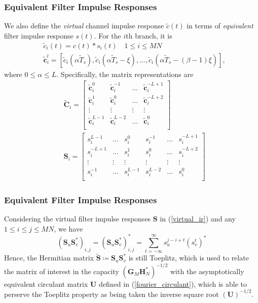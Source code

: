 \documentclass{beamer}
\begin{document}
\begin{frame}
\frametitle{Equivalent Filter Impulse Responses}
We also define the \emph{virtual} channel impulse response $\tilde{c}(t)$ in terms of \emph{equivalent} filter impulse response $s(t)$. For the $i$th branch, it is
\begin{align}
  &\tilde{c}_i(t) = c(t)*s_i(t) \quad 1\leq i\leq MN\nonumber \\
  &\tilde{\pmb{c}}_i^l = \left[\tilde{c}_i(\alpha\tilde{T}_s),\tilde{c}_i(\alpha\tilde{T}_s-\xi),\dots,\tilde{c}_i(\alpha\tilde{T}_s-(\beta-1)\xi)\right],\nonumber
\end{align}
where $0\leq\alpha\leq L$. Specifically, the matrix representations are
\begin{align}
   &\tilde{\pmb{C}}_i = \begin{bmatrix}
     \tilde{\pmb{c}}_i^0 & \tilde{\pmb{c}}_i^{-1} & \dots & \tilde{\pmb{c}}_i^{-L+1} \\%
     \tilde{\pmb{c}}_i^1 & \tilde{\pmb{c}}_i^0 & \dots & \tilde{\pmb{c}}_i^{-L+2} \\%
     \vdots & \vdots & \vdots & \vdots \\%
     \tilde{\pmb{c}}_i^{L-1} & \tilde{\pmb{c}}_i^{L-2} & \dots & \tilde{\pmb{c}}_i^0 \\%
     \end{bmatrix} \\[2mm]
     \label{virtual_ir}
    &\pmb{S}_i = \begin{bmatrix}
      s_i^{L-1} & \dots & s_i^0 & s_i^{-1} & \dots & s_i^{-L+1} \\%
     s_i^{-L+1} & \dots & s_i^1 & s_i^0 & \dots & s_i^{-L+2} \\%
     \vdots & \vdots & \vdots & \vdots & \vdots & \vdots \\%
     s_i^{-1} & \dots & s_i^{L-1} & s_i^{L-2} & \dots & s_i^0 \\%
    \end{bmatrix}
\end{align}
\end{frame}

\begin{frame}
\frametitle{Equivalent Filter Impulse Responses}
Considering the virtual filter impulse responses $\pmb{S}$ in (\ref{virtual_ir}) and any $1\leq i\leq j\leq MN$, we have
\begin{equation}
  \left(\pmb{S}_u\pmb{S}_v^*\right)_{i,j} = \left(\pmb{S}_u\pmb{S}_v^*\right)_{i,j}^*=\sum_{t=-\infty}^{\infty} s_u^{j-i+t}(s_v^t)^*
\end{equation}
Hence, the Hermitian matrix $\tilde{\pmb{S}}\coloneqq \pmb{S}_u\pmb{S}_v^*$ is still Toeplitz, which is used to relate the matrix of interest in the capacity $(\pmb{G}_M\pmb{H}^*_N)^{-1/2}$ with the asymptotically equivalent circulant matrix $\pmb{U}$ defined in (\ref{fourier_circulant}), which is able to perserve the Toeplitz property as being taken the inverse square root $(\pmb{U})^{-1/2}$.
\end{frame}
\end{document}
